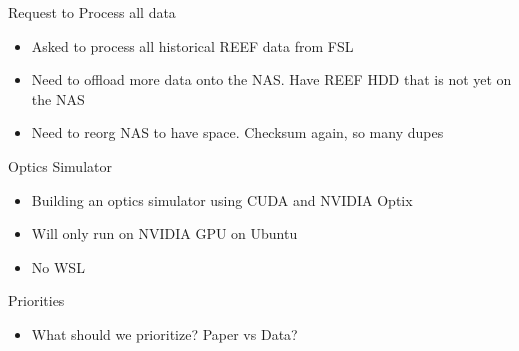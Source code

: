 \begin{frame}{Request to Process all data}
    \begin{itemize}
        \item Asked to process all historical REEF data from FSL
        \item Need to offload more data onto the NAS.  Have REEF HDD that is not yet on the NAS
        \item Need to reorg NAS to have space.  Checksum again, so many dupes
    \end{itemize}
\end{frame}

\begin{frame}{Optics Simulator}
    \begin{itemize}
        \item Building an optics simulator using CUDA and NVIDIA Optix
        \item Will only run on NVIDIA GPU on Ubuntu
        \item No WSL
    \end{itemize}
\end{frame}

\begin{frame}{Priorities}
    \begin{itemize}
        \item What should we prioritize?  Paper vs Data?
    \end{itemize}
\end{frame}




